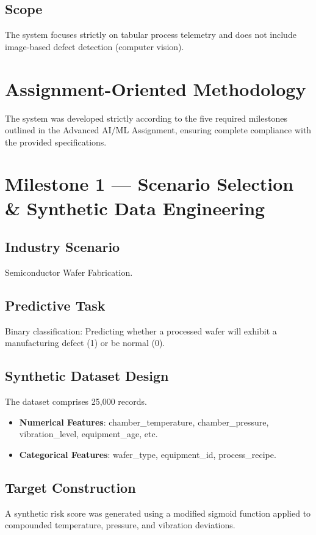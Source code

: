 \documentclass[12pt, a4paper]{article}
\begin{document}
\subsection{Scope}
The system focuses strictly on tabular process telemetry and does not include image-based defect detection (computer vision).

\section{Assignment-Oriented Methodology}
The system was developed strictly according to the five required milestones outlined in the Advanced AI/ML Assignment, ensuring complete compliance with the provided specifications.

\section{Milestone 1 — Scenario Selection \& Synthetic Data Engineering}
\subsection{Industry Scenario}
Semiconductor Wafer Fabrication.

\subsection{Predictive Task}
Binary classification: Predicting whether a processed wafer will exhibit a manufacturing defect (1) or be normal (0).

\subsection{Synthetic Dataset Design}
The dataset comprises 25,000 records. 
\begin{itemize}
    \item \textbf{Numerical Features}: chamber\_temperature, chamber\_pressure, vibration\_level, equipment\_age, etc.
    \item \textbf{Categorical Features}: wafer\_type, equipment\_id, process\_recipe.
\end{itemize}

\subsection{Target Construction}
A synthetic risk score was generated using a modified sigmoid function applied to compounded temperature, pressure, and vibration deviations. 
\end{document}
